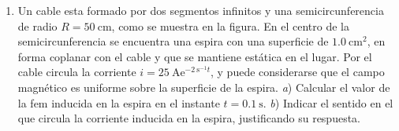 \documentclass[a4paper,11pt,dvipsnames]{article}
\begin{document}
\begin{enumerate}[leftmargin=*]
\item
\begin{minipage}[t]{.5\textwidth}
  Un cable esta formado por dos segmentos infinitos y una semicircunferencia de radio $R = \SI{50}{\centi\metre}$, como se muestra en la figura. En el centro de la semicircunferencia se encuentra una espira con una superficie de $\SI{1.0}{\centi\metre\squared}$, en forma coplanar con el cable y que se mantiene estática en el lugar. Por el cable circula la corriente $i = \SI{25}{\ampere}\text{e}^{-\SI{2}{\second^{-1}}t}$, y puede considerarse que el campo magnético es uniforme sobre la superficie de la espira. \textit{a}) Calcular el valor de la fem inducida en la espira en el instante $t= \SI{0.1}{\second}$. \textit{b}) Indicar el sentido en el que circula la corriente inducida en la espira, justificando su respuesta.    
\end{minipage}
\begin{minipage}[t]{0.5\textwidth}
\strut\vspace*{-\baselineskip}
\begin{center}
  \end{center}
\end{minipage}
%

\end{enumerate}
\end{document}
